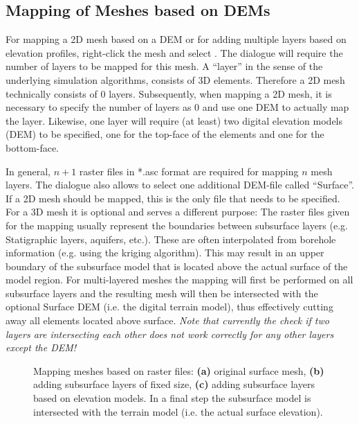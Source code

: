 \subsection{Mapping of Meshes based on DEMs}
\label{meshondemmapping}

For mapping a 2D mesh based on a DEM or for adding multiple layers based on elevation profiles, right-click the mesh and select . The dialogue will require the number of layers to be mapped for this mesh. A ``layer'' in the sense of the underlying simulation algorithms, consists of 3D elements. Therefore a 2D mesh technically consists of $0$ layers. Subsequently, when mapping a 2D mesh, it is necessary to specify the number of layers as $0$ and use one DEM to actually map the layer. Likewise, one layer will require (at least) two digital elevation models (DEM) to be specified, one for the top-face of the elements and one for the bottom-face.

In general, $n+1$ raster files in *.asc format are required for mapping $n$ mesh layers. The dialogue also allows to select one additional DEM-file called ``Surface''. If a 2D mesh should be mapped, this is the only file that needs to be specified. For a 3D mesh it is optional and serves a different purpose: The raster files given for the mapping usually represent the boundaries between subsurface layers (e.g. Statigraphic layers, aquifers, etc.). These are often interpolated from borehole information (e.g. using the kriging algorithm). This may result in an upper boundary of the subsurface model that is located above the actual surface of the model region. For multi-layered meshes the mapping will first be performed on all subsurface layers and the resulting mesh will then be intersected with the optional Surface DEM (i.e. the digital terrain model), thus effectively cutting away all elements located above surface. \emph{Note that currently the check if two layers are intersecting each other does \emph{not} work correctly for any other layers except the DEM!}

\begin{figure}[tb]
\begin{center}
\enspace
{}\enspace
{}
\end{center}
\caption{Mapping meshes based on raster files: \textbf{(a)} original surface mesh, \textbf{(b)} adding subsurface layers of fixed size, \textbf{(c)} adding subsurface layers based on elevation models. In a final step the subsurface model is intersected with the terrain model (i.e. the actual surface elevation).}
\label{fig:RasterMapping}
\end{figure}

